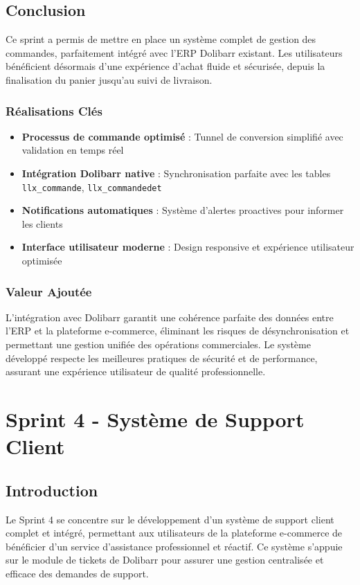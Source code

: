 \documentclass[12pt,a4paper]{report}
\begin{document}
\section{Conclusion}
Ce sprint a permis de mettre en place un système complet de gestion des commandes, parfaitement intégré avec l'ERP Dolibarr existant. Les utilisateurs bénéficient désormais d'une expérience d'achat fluide et sécurisée, depuis la finalisation du panier jusqu'au suivi de livraison.

\subsection{Réalisations Clés}
\begin{itemize}
\item \textbf{Processus de commande optimisé} : Tunnel de conversion simplifié avec validation en temps réel
\item \textbf{Intégration Dolibarr native} : Synchronisation parfaite avec les tables \texttt{llx\_commande}, \texttt{llx\_commandedet} 
\item \textbf{Notifications automatiques} : Système d'alertes proactives pour informer les clients
\item \textbf{Interface utilisateur moderne} : Design responsive et expérience utilisateur optimisée
\end{itemize}

\subsection{Valeur Ajoutée}
L'intégration avec Dolibarr garantit une cohérence parfaite des données entre l'ERP et la plateforme e-commerce, éliminant les risques de désynchronisation et permettant une gestion unifiée des opérations commerciales. Le système développé respecte les meilleures pratiques de sécurité et de performance, assurant une expérience utilisateur de qualité professionnelle.

\chapter{Sprint 4 - Système de Support Client}
\section{Introduction}
Le Sprint 4 se concentre sur le développement d'un système de support client complet et intégré, permettant aux utilisateurs de la plateforme e-commerce de bénéficier d'un service d'assistance professionnel et réactif. Ce système s'appuie sur le module de tickets de Dolibarr pour assurer une gestion centralisée et efficace des demandes de support.
\end{document}
